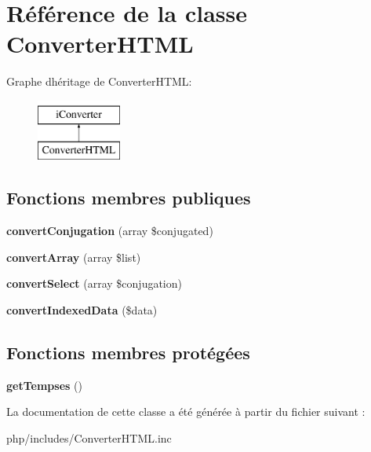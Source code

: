 \hypertarget{classConverterHTML}{}\section{Référence de la classe Converter\+H\+T\+ML}
\label{classConverterHTML}
Graphe d\textquotesingle{}héritage de Converter\+H\+T\+ML\+:\begin{figure}[H]
\begin{center}
\leavevmode
\includegraphics[height=2.000000cm]{classConverterHTML}
\end{center}
\end{figure}
\subsection*{Fonctions membres publiques}
\begin{DoxyCompactItemize}
\item 
\hypertarget{classConverterHTML_ad759ada61baaa9aa4f4c0f1d67182c05}{}\label{classConverterHTML_ad759ada61baaa9aa4f4c0f1d67182c05} 
{\bfseries convert\+Conjugation} (array \$conjugated)
\item 
\hypertarget{classConverterHTML_a62390602025ffe49e7b339a7782ddf72}{}\label{classConverterHTML_a62390602025ffe49e7b339a7782ddf72} 
{\bfseries convert\+Array} (array \$list)
\item 
\hypertarget{classConverterHTML_ae8152b5bc5d7a537c76e844df546dcbc}{}\label{classConverterHTML_ae8152b5bc5d7a537c76e844df546dcbc} 
{\bfseries convert\+Select} (array \$conjugation)
\item 
\hypertarget{classConverterHTML_a8cda80b6e1312b5f11e47fc719a511b3}{}\label{classConverterHTML_a8cda80b6e1312b5f11e47fc719a511b3} 
{\bfseries convert\+Indexed\+Data} (\$data)
\end{DoxyCompactItemize}
\subsection*{Fonctions membres protégées}
\begin{DoxyCompactItemize}
\item 
\hypertarget{classConverterHTML_a385bc4a802dc51c920ea5152df4adcb3}{}\label{classConverterHTML_a385bc4a802dc51c920ea5152df4adcb3} 
{\bfseries get\+Tempses} ()
\end{DoxyCompactItemize}


La documentation de cette classe a été générée à partir du fichier suivant \+:\begin{DoxyCompactItemize}
\item 
php/includes/Converter\+H\+T\+M\+L.\+inc\end{DoxyCompactItemize}
